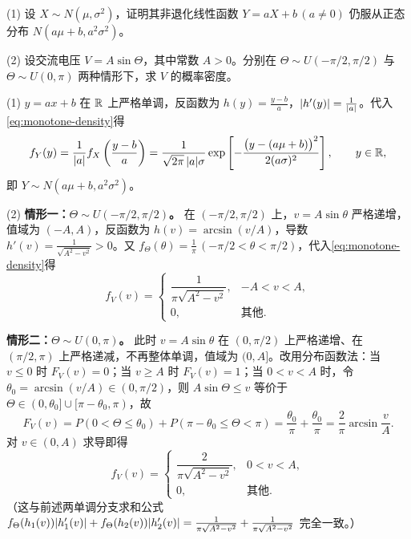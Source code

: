 \begin{example}[title={正态变量的线性变换与交流电压分布}]
\label{eg:monotone-examples}
(1) 设 $X\sim N(\mu,\sigma^2)$，证明其非退化线性函数 $Y=aX+b\,(a\ne 0)$ 仍服从正态分布 $N(a\mu+b,a^2\sigma^2)$。

(2) 设交流电压 $V=A\sin\Theta$，其中常数 $A>0$。分别在 $\Theta\sim U(-\pi/2,\pi/2)$ 与 $\Theta\sim U(0,\pi)$ 两种情形下，求 $V$ 的概率密度。
\begin{solution}
(1) $y=ax+b$ 在 $\mathbb{R}$ 上严格单调，反函数为 $h(y)=\frac{y-b}{a}$，$\lvert h'(y)\rvert=\frac{1}{\lvert a\rvert}$。代入\eqref{eq:monotone-density}得
\[
  f_Y(y)=\frac{1}{\lvert a\rvert}f_X\left(\frac{y-b}{a}\right)
  =\frac{1}{\sqrt{2\pi}\,\lvert a\rvert\sigma}\exp\left[-\frac{\bigl(y-(a\mu+b)\bigr)^2}{2(a\sigma)^2}\right],\qquad y\in\mathbb{R},
\]
即 $Y\sim N(a\mu+b,a^2\sigma^2)$。

(2) \textbf{情形一：$\Theta\sim U(-\pi/2,\pi/2)$。} 在 $(-\pi/2,\pi/2)$ 上，$v=A\sin\theta$ 严格递增，值域为 $(-A,A)$，反函数为 $h(v)=\arcsin(v/A)$，导数 $h'(v)=\frac{1}{\sqrt{A^2-v^2}}>0$。又 $f_\Theta(\theta)=\frac{1}{\pi}\,(-\pi/2<\theta<\pi/2)$，代入\eqref{eq:monotone-density}得
\[
  f_V(v)=
  \begin{cases}
    \dfrac{1}{\pi\sqrt{A^2-v^2}},& -A<v<A,\\
    0,& \text{其他}.
  \end{cases}
\]

\textbf{情形二：$\Theta\sim U(0,\pi)$。} 此时 $v=A\sin\theta$ 在 $(0,\pi/2)$ 上严格递增、在 $(\pi/2,\pi)$ 上严格递减，不再整体单调，值域为 $(0,A]$。改用分布函数法：当 $v\le 0$ 时 $F_V(v)=0$；当 $v\ge A$ 时 $F_V(v)=1$；当 $0<v<A$ 时，令 $\theta_0=\arcsin(v/A)\in(0,\pi/2)$，则 $A\sin\Theta\le v$ 等价于 $\Theta\in(0,\theta_0]\cup[\pi-\theta_0,\pi)$，故
\[
  F_V(v)=P(0<\Theta\le\theta_0)+P(\pi-\theta_0\le\Theta<\pi)
  =\frac{\theta_0}{\pi}+\frac{\theta_0}{\pi}
  =\frac{2}{\pi}\arcsin\frac{v}{A}.
\]
对 $v\in(0,A)$ 求导即得
\[
  f_V(v)=
  \begin{cases}
    \dfrac{2}{\pi\sqrt{A^2-v^2}},& 0<v<A,\\
    0,& \text{其他}.
  \end{cases}
\]
（这与前述两单调分支求和公式 $f_\Theta(h_1(v))\lvert h_1'(v)\rvert+f_\Theta(h_2(v))\lvert h_2'(v)\rvert=\frac{1}{\pi\sqrt{A^2-v^2}}+\frac{1}{\pi\sqrt{A^2-v^2}}$ 完全一致。）
\end{solution}
\end{example}


